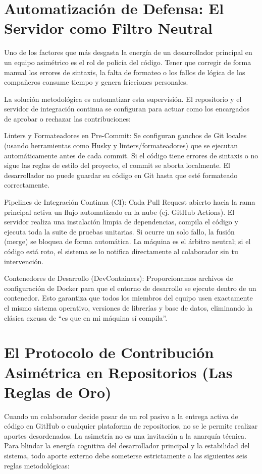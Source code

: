 \documentclass[14pt,a4paper,oneside]{extbook}
\begin{document}
\section{Automatización de Defensa: El Servidor como Filtro Neutral}

Uno de los factores que más desgasta la energía de un desarrollador principal en un equipo asimétrico es el rol de policía del código. Tener que corregir de forma manual los errores de sintaxis, la falta de formateo o los fallos de lógica de los compañeros consume tiempo y genera fricciones personales.

La solución metodológica es automatizar esta supervisión. El repositorio y el servidor de integración continua se configuran para actuar como los encargados de aprobar o rechazar las contribuciones:

Linters y Formateadores en Pre-Commit: Se configuran ganchos de Git locales (usando herramientas como Husky y linters/formateadores) que se ejecutan automáticamente antes de cada commit. Si el código tiene errores de sintaxis o no sigue las reglas de estilo del proyecto, el commit se aborta localmente. El desarrollador no puede guardar su código en Git hasta que esté formateado correctamente.

Pipelines de Integración Continua (CI): Cada Pull Request abierto hacia la rama principal activa un flujo automatizado en la nube (ej. GitHub Actions). El servidor realiza una instalación limpia de dependencias, compila el código y ejecuta toda la suite de pruebas unitarias. Si ocurre un solo fallo, la fusión (merge) se bloquea de forma automática. La máquina es el árbitro neutral; si el código está roto, el sistema se lo notifica directamente al colaborador sin tu intervención.

Contenedores de Desarrollo (DevContainers): Proporcionamos archivos de configuración de Docker para que el entorno de desarrollo se ejecute dentro de un contenedor. Esto garantiza que todos los miembros del equipo usen exactamente el mismo sistema operativo, versiones de librerías y base de datos, eliminando la clásica excusa de \enquote{es que en mi máquina sí compila}.

\section{El Protocolo de Contribución Asimétrica en Repositorios (Las Reglas de Oro)}

Cuando un colaborador decide pasar de un rol pasivo a la entrega activa de código en GitHub o cualquier plataforma de repositorios, no se le permite realizar aportes desordenados. La asimetría no es una invitación a la anarquía técnica. Para blindar la energía cognitiva del desarrollador principal y la estabilidad del sistema, todo aporte externo debe someterse estrictamente a las siguientes seis reglas metodológicas:
\end{document}
